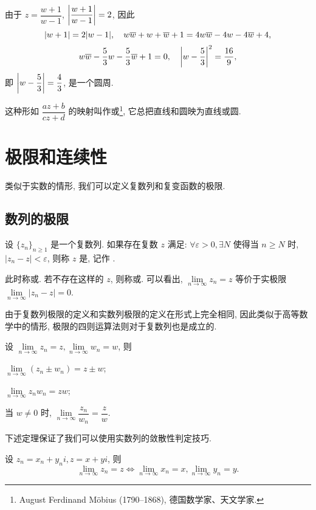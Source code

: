 \begin{solution}
  由于 $z=\dfrac{w+1}{w-1}$, $\left|\dfrac{w+1}{w-1}\right|=2$,
  {因此
  \[|w+1|=2|w-1|,\quad w\overline w+w+\overline w+1=4w\overline w-4w-4\overline w+4,\]}
  {
    \[w\overline w-\frac53 w-\frac53\overline w+1=0,\quad \left|w-\frac53\right|^2=\dfrac{16}9,\]即 $\left|w-\dfrac53\right|=\dfrac43$, 是一个圆周.}
\end{solution}
这种形如 $\dfrac{az+b}{cz+d}$ 的映射叫作或\footnote{
  August Ferdinand M\"obius (1790--1868), 德国数学家、天文学家.
}, 它总把直线和圆映为直线或圆.


\section{极限和连续性}

类似于实数的情形, 我们可以定义复数列和复变函数的极限.

\subsection{数列的极限}

\begin{definition}
  设 $\{z_n\}_{n\ge 1}$ 是一个复数列.
  如果存在复数 $z$ 满足: $\forall \varepsilon>0,\exists N$ 使得当 $n\ge N$ 时, $|z_n-z|<\varepsilon$, 则称 $z$ 是, 记作 .
\end{definition}
此时称或.
若不存在这样的 $z$, 则称或.
可以看出, $\lim\limits_{n\to\infty}z_n=z$ 等价于实极限 $\lim\limits_{n\to\infty}|z_n-z|=0$.

由于复数列极限的定义和实数列极限的定义在形式上完全相同, 因此类似于高等数学中的情形, 极限的四则运算法则对于复数列也是成立的.
\begin{theorem}
  设 $\lim\limits_{n\to\infty}z_n=z,\lim\limits_{n\to\infty}w_n=w$, 则
  \begin{enumpar}
    \item $\lim\limits_{n\to\infty}(z_n\pm w_n)=z\pm w$;
    \item $\lim\limits_{n\to\infty} z_nw_n=zw$;
    \item 当 $w\neq 0$ 时, $\lim\limits_{n\to\infty}\dfrac{z_n}{w_n}=\dfrac zw$.
  \end{enumpar}
\end{theorem}

下述定理保证了我们可以使用实数列的敛散性判定技巧.
\begin{theorem}
  设 $z_n=x_n+y_ni,z=x+yi$, 则
  \[\lim_{n\to\infty}z_n=z\iff \lim_{n\to\infty}x_n=x,\lim_{n\to\infty}y_n=y.\]
\end{theorem}

